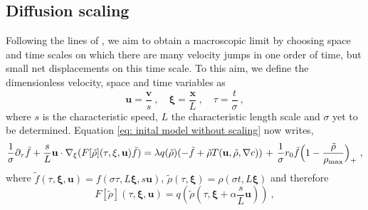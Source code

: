 \documentclass{article}
\begin{document}
\subsection{Diffusion scaling} Following the lines of \cite{Hillen2009}, we aim to obtain a macroscopic limit by choosing space and time scales on which {there are many velocity jumps in one order of time, but small net displacements on this time scale}. To this aim, we define the dimensionless velocity, space and time variables as
\begin{equation}
\mathbf{u} = \frac{\mathbf{v}}{s}\ , \quad \mathbf{\xi} = \frac{\mathbf{x}}{L}\ , \quad \tau = \frac{t}{\sigma}\ , \nonumber
\end{equation}
\noindent where $s$ is the characteristic speed, $L$ the characteristic length scale and $\sigma$ yet to be determined. Equation \eqref{eq: inital model without scaling} now writes,
\begin{equation}
    {{\frac{1}{\sigma}}} \partial_\tau \tilde{f}+ \frac{s}{L} \mathbf{u} \cdot \nabla_\xi (F[\tilde{\rho}](\tau,\mathbf{\xi},\mathbf{u}) \tilde{f})= \lambda q(\tilde{\rho})(-\tilde{f}+\tilde{\rho} T(\mathbf{u},\tilde{\rho},\nabla c)){\ +\ \frac{1}{\sigma} r_0\tilde{f}\Bigl(1-\frac{\tilde{\rho}}{\rho_{\textnormal{max}}} \Bigr)_+}\ ,\label{eq: scaled model}
\end{equation}
\noindent where {{$\tilde{f}(\tau,\mathbf{\xi},\mathbf{u}) = f(\sigma \tau,L \mathbf{\xi} ,s \mathbf{u})$}}, $\tilde{\rho}(\tau,\mathbf{\xi}) = \rho(\sigma t,L \mathbf{\xi})$ and therefore 
\begin{equation}
F[\tilde{\rho}](\tau,\mathbf{\xi},\mathbf{u}) = {{q(\tilde{\rho}(\tau, \mathbf{\xi} + \alpha \frac{s}{L} \mathbf{u}))}}\ , \nonumber
\end{equation}
\end{document}
